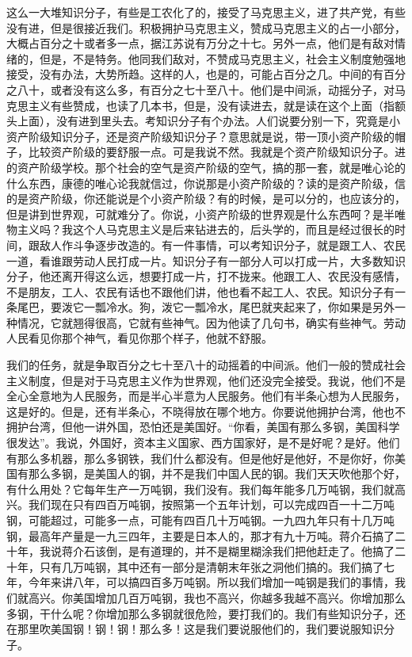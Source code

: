 这么一大堆知识分子，有些是工农化了的，接受了马克思主义，进了共产党，有些没有进，但是很接近我们。积极拥护马克思主义，赞成马克思主义的占一小部分，大概占百分之十或者多一点，据江苏说有万分之十七。另外一点，他们是有敌对情绪的，但是，不是特务。他同我们敌对，不赞成马克思主义，社会主义制度勉强地接受，没有办法，大势所趋。这样的人，也是的，可能占百分之几。中间的有百分之八十，或者没有这么多，有百分之七十至八十。他们是中间派，动摇分子，对马克思主义有些赞成，也读了几本书，但是，没有读进去，就是读在这个上面（指额头上面），没有进到里头去。考知识分子有个办法。人们说要分别一下，究竟是小资产阶级知识分子，还是资产阶级知识分子？意思就是说，带一顶小资产阶级的帽子，比较资产阶级的要舒服一点。可是我说不然。我就是个资产阶级知识分子。进的资产阶级学校。那个社会的空气是资产阶级的空气，搞的那一套，就是唯心论的什么东西，康德的唯心论我就信过，你说那是小资产阶级的？读的是资产阶级，信的是资产阶级，你还能说是个小资产阶级？有的时候，是可以分的，也应该分的，但是讲到世界观，可就难分了。你说，小资产阶级的世界观是什么东西呵？是半唯物主义吗？我这个人马克思主义是后来钻进去的，后头学的，而且是经过很长的时间，跟敌人作斗争逐步改造的。有一件事情，可以考知识分子，就是跟工人、农民一道，看谁跟劳动人民打成一片。知识分子有一部分人可以打成一片，大多数知识分子，他还离开得这么远，想要打成一片，打不拢来。他跟工人、农民没有感情，不是朋友，工人、农民有话也不跟他们讲，他也看不起工人、农民。知识分子有一条尾巴，要泼它一瓢冷水。狗，泼它一瓢冷水，尾巴就夹起来了，你如果是另外一种情况，它就翘得很高，它就有些神气。因为他读了几句书，确实有些神气。劳动人民看见你那个神气，看见你那个样子，他就不舒服。

我们的任务，就是争取百分之七十至八十的动摇着的中间派。他们一般的赞成社会主义制度，但是对于马克思主义作为世界观，他们还没完全接受。我说，他们不是全心全意地为人民服务，而是半心半意为人民服务。他们有半条心想为人民服务，这是好的。但是，还有半条心，不晓得放在哪个地方。你要说他拥护台湾，他也不拥护台湾，但他一讲外国，恐怕还是美国好。“你看，美国有那么多钢，美国科学很发达”。我说，外国好，资本主义国家、西方国家好，是不是好呢？是好。他们有那么多机器，那么多钢铁，我们什么都没有。但是他好是他好，不是你好，你美国有那么多钢，是美国人的钢，并不是我们中国人民的钢。我们天天吹他那个好，有什么用处？它每年生产一万吨钢，我们没有。我们每年能多几万吨钢，我们就高兴。我们现在只有四百万吨钢，按照第一个五年计划，可以完成四百一十二万吨钢，可能超过，可能多一点，可能有四百几十万吨钢。一九四九年只有十几万吨钢，最高年产量是一九三四年，主要是日本人的，那才有九十万吨。蒋介石搞了二十年，我说蒋介石该倒，是有道理的，并不是糊里糊涂我们把他赶走了。他搞了二十年，只有几万吨钢，其中还有一部分是清朝末年张之洞他们搞的。我们搞了七年，今年来讲八年，可以搞四百多万吨钢。所以我们增加一吨钢是我们的事情，我们就高兴。你美国增加几百万吨钢，我也不高兴，你越多我越不高兴。你增加那么多钢，干什么呢？你增加那么多钢就很危险，要打我们的。我们有些知识分子，还在那里吹美国钢！钢！钢！那么多！这是我们要说服他们的，我们要说服知识分子。

